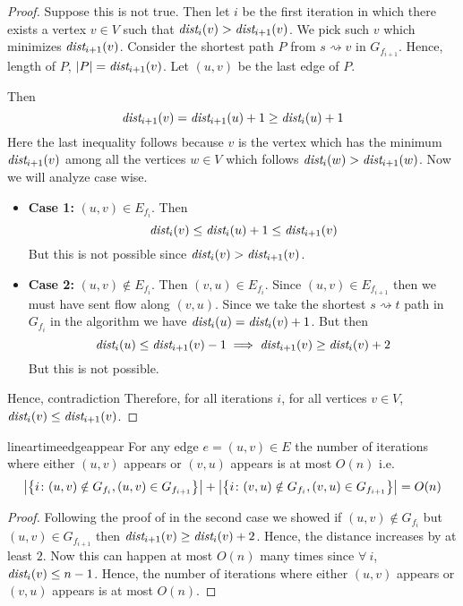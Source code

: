 \begin{proof}
	Suppose this is not true. Then let $i$ be the first iteration in which there exists a vertex $v\in V$ such that $\emph{dist}_i(v)>\emph{dist}_{i+1}(v)$. We pick such $v$ which minimizes $\emph{dist}_{i+1}(v)$. Consider the shortest path $P$ from $s\rightsquigarrow v$ in $G_{f_{i+1}}$. Hence, length of $P$, $|P|=\emph{dist}_{i+1}(v)$. Let $(u,v)$ be the last edge of $P$.
	\begin{center}
	\end{center}
	Then $$\emph{dist}_{i+1}(v)=\emph{dist}_{i+1}(u)+1\geq \emph{dist}_i(u)+1$$Here the last inequality follows because $v$ is the vertex which has the minimum $\emph{dist}_{i+1}(v)$ among all the vertices $w\in V$ which follows $\emph{dist}_i(w)>\emph{dist}_{i+1}(w)$. Now we will analyze case wise.\begin{itemize}
		\item \textbf{Case 1:} $(u,v)\in E_{f_i}$. Then $$\emph{dist}_i(v)\leq \emph{dist}_{i}(u)+1\leq \emph{dist}_{i+1}(v)$$But this is not possible since $\emph{dist}_i(v)>\emph{dist}_{i+1}(v)$.
		\item \textbf{Case 2:} $(u,v)\notin E_{f_i}$. Then $(v,u)\in E_{f_i}$. Since $(u,v)\in E_{f_{i+1}}$ then we must have sent flow along $(v,u)$. Since we take the shortest $s\rightsquigarrow t$ path in $G_{f_i}$ in the algorithm we have $\emph{dist}_i(u)=\emph{dist}_i(v)+1$. But then $$\emph{dist}_i(u)\leq \emph{dist}_{i+1}(v)-1\implies \emph{dist}_{i+1}(v)\geq \emph{dist}_i(v)+2$$But this is not possible.
	\end{itemize}
	Hence, contradiction \ctr Therefore, for all iterations $i$, for all vertices $v\in V$, $\emph{dist}_i(v)\leq \emph{dist}_{i+1}(v)$.
\end{proof}

\begin{lemma}{}{lineartimeedgeappear}
	For any edge $e=(u,v)\in E$ the number of iterations where either $(u,v)$ appears or $(v,u)$ appears is at most $O(n)$ i.e. $$\left|\left\{i\colon (u,v)\notin G_{f_i}, (u,v)\in G_{f_{i+1}}\right\}\right|+\left|\left\{i\colon (v,u)\notin G_{f_i}, (v,u)\in G_{f_{i+1}}\right\}\right|=O(n)$$
\end{lemma}
\begin{proof}
	Following the proof of   in the second case we showed if $(u,v)\notin G_{f_i}$ but $(u,v)\in G_{f_{i+1}}$ then $\emph{dist}_{i+1}(v)\geq \emph{dist}_i(v)+2$. Hence, the distance increases by at least $2$. Now this can happen at most $O(n)$ many times since $\forall\ i$, $\emph{dist}_i(v)\leq n-1$. Hence, the number of iterations where either $(u,v)$ appears or $(v,u)$ appears is at most $O(n)$.
\end{proof}

